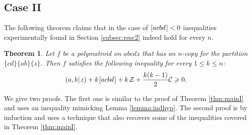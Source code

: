 \documentclass[reqno]{amsart}
\newtheorem{theorem}{Theorem}
\theoremstyle{definition}
\newcommand\tsp{\mkern 1.5mu}
\def\|{\mkern1.5mu{|}\mkern1.5mu}
\renewcommand\ge{\geqslant}\renewcommand\le{\leqslant}
\newcommand\C{\mathcal C}
\newcommand\Z{\mathcal Z} %
\def\acbd{[acbd\tsp]}
\begin{document}
\subsection{Case II}

The following theorem claims that in the case of $\acbd<0$ inequalities
experimentally found in Section \ref{subsec:resc2} indeed hold for every
$n$.

\begin{theorem}\label{thm:mainII}
Let $f$ be a polymatroid on $abcdz$ that has an $n$-copy for the
partition $\{cd\}\{ab\}\{z\}$. Then $f$ satisfies the following
inequality for every $1\le k\le n$:
$$
  (a,b\|z)+ k\tsp\acbd+k\tsp\Z+\frac{k(k-1)}2\C \ge 0.
$$
\end{theorem}

We give two proofs. The first one is similar to the proof of Theorem
\ref{thm:mainI} and uses an inequality mimicking Lemma \ref{lemma:indhyp}.
The second proof is by induction and uses a technique that also recovers
some of the inequalities covered in Theorem \ref{thm:mainI}.
\end{document}
